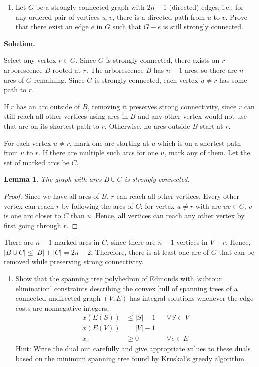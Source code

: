 \documentclass[11pt,letterpaper]{article}
\newtheorem{lemma}[theorem]{Lemma}
\theoremstyle{definition}
\newcommand{\solution}{\medskip\noindent\textbf{Solution.}\par\medskip}
\begin{document}
\begin{enumerate}[resume=q]
\item[8.*] Let $G$ be a strongly connected graph with $2n-1$ (directed) edges, i.e., for any ordered pair of vertices $u, v$, there is a directed path from $u$ to $v$. Prove that there exist an edge $e$ in $G$ such that $G - e$ is still strongly connected.
\end{enumerate}

\solution
Select any vertex $r\in G$. 
Since $G$ is strongly connected, there exists an $r$-arborescence $B$ rooted at $r$.
The arborescence $B$ has $n-1$ arcs, so there are $n$ arcs of $G$ remaining.
Since $G$ is strongly connected, each vertex $u\neq r$ has some path to $r$.

If $r$ has an arc outside of $B$, removing it preserves strong connectivity, since $r$ can still reach all other vertices using arcs in $B$ and any other vertex would not use that arc on its shortest path to $r$.
Otherwise, no arcs outside $B$ start at $r$.

For each vertex $u\neq r$, mark one arc starting at $u$ which is on a shortest path from $u$ to $r$. 
If there are multiple such arcs for one $u$, mark any of them. 
Let the set of marked arcs be $C$.

\begin{lemma}
    The graph with arcs $B\cup C$ is strongly connected.
\end{lemma}
\begin{proof}
    Since we have all arcs of $B$, $r$ can reach all other vertices. 
    Every other vertex can reach $r$ by following the arcs of $C$: for vertex $u\neq r$ with arc $uv\in C$, $v$ is one arc closer to $C$ than $u$.
    Hence, all vertices can reach any other vertex by first going through $r$. 
\end{proof}

There are $n-1$ marked arcs in $C$, since there are $n-1$ vertices in $V-r$. 
Hence, $|B\cup C| \leq |B| + |C| = 2n-2$. 
Therefore, there is at least one arc of $G$ that can be removed while preserving strong connectivity.

\begin{enumerate}[resume=q]
\item[9.*] Show that the spanning tree polyhedron of Edmonds with `subtour elimination' constraints describing the convex hull of spanning trees of a connected undirected graph $(V,E)$ has integral solutions whenever the edge costs are nonnegative integers.
\begin{align*}
    x(E(S)) &\leq |S| - 1 && \forall S \subset V \\
    x(E(V)) &= |V| - 1 \\
    x_e &\geq 0 && \forall e \in E
\end{align*}
Hint: Write the dual out carefully and give appropriate values to these duals based on the minimum spanning tree found by Kruskal's greedy algorithm.
\end{enumerate}
\end{document}

